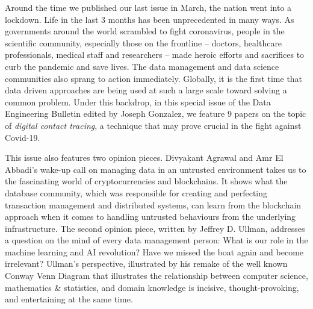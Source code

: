 \documentclass[11pt]{article}
\begin{document}
Around the time we published our last issue in March, the nation went
into a lockdown. Life in the last 3 months has been unprecedented in
many ways. As governments around the world scrambled to fight
coronavirus, people in the scientific community, especially those on
the frontline -- doctors, healthcare professionals, medical staff and
researchers -- made heroic efforts and sacrifices to curb the pandemic
and save lives. The data management and data science communities also
sprang to action immediately. Globally, it is the first time that data
driven approaches are being used at such a large scale toward solving
a common problem. Under this backdrop, in this special issue of the
Data Engineering Bulletin edited by Joseph Gonzalez, we feature 9
papers on the topic of {\it digital contact tracing}, a technique that
may prove crucial in the fight against Covid-19.

This issue also features two opinion pieces. Divyakant Agrawal and Amr
El Abbadi's wake-up call on managing data in an untrusted environment
takes us to the fascinating world of cryptocurrencies and
blockchains. It shows what the database community, which was
responsible for creating and perfecting transaction management and
distributed systems, can learn from the blockchain approach when it
comes to handling untrusted behaviours from the underlying
infrastructure. The second opinion piece, written by Jeffrey
D. Ullman, addresses a question on the mind of every data management
person: What is our role in the machine learning and AI revolution?
Have we missed the boat again and become irrelevant? Ullman's
perspective, illustrated by his remake of the well known Conway Venn
Diagram that illustrates the relationship between computer science,
mathematics \& statistics, and domain knowledge is incisive,
thought-provoking, and entertaining at the same time.
\end{document}
